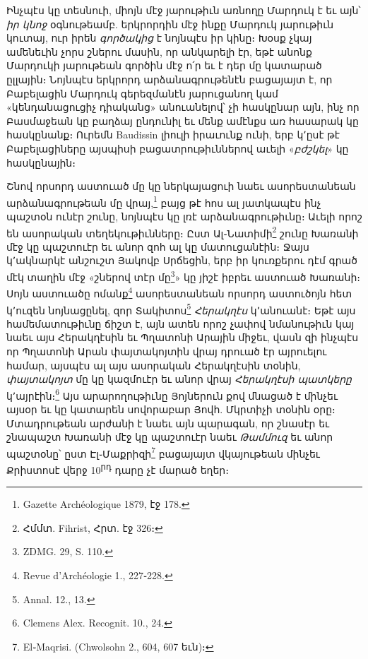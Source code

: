 \documentclass{article}
\begin{document}
{Ինչպէս կը տեսնուի, միոյն մէջ յարութիւն առնողը Մարդուկ է եւ այն՝ \emph{իր կնոջ} օգնութեամբ. երկրորդին մէջ ինքը Մարդուկ յարութիւն կուտայ, ուր իրեն \emph{գործակից} է նոյնպէս իր կինը։ Խօսք չկայ ամենեւին չորս շներու մասին, որ անկարելի էր, եթէ անոնք Մարդուկի յարութեան գործին մէջ ո՛ր եւ է դեր մը կատարած ըլլային։ Նոյնպէս երկրորդ արձանագրութենէն բացայայտ է, որ Բաբելացին Մարդուկ գերեզմանէն յարուցանող կամ «կենդանացուցիչ դիականց» անուանելով՝ չի հասկընար այն, ինչ որ Բասմաջեան կը բաղձայ ընդունիլ եւ մենք ամէնքս առ հասարակ կը հասկընանք։ Ուրեմն Baudissin լիուլի իրաւունք ունի, երբ կ՚ըսէ թէ Բաբելացիները այսպիսի բացատրութիւններով աւելի «\emph{բժշկել}» կը հասկընային։

Շնով որսորդ աստուած մը կը ներկայացուի նաեւ ասորեստանեան արձանագրութեան մը վրայ,\footnote{Gazette Archéologique 1879, էջ 178.} բայց թէ հոս ալ յատկապէս ինչ պաշտօն ունէր շունը, նոյնպէս կը լռէ արձանագրութիւնը։ Աւելի որոշ են ասորական տեղեկութիւնները։ Ըստ Ալ֊Նատիմի\footnote{Հմմտ. Fihrist, Հրտ. էջ 326։} շունը Խառանի մէջ կը պաշտուէր եւ անոր զոհ ալ կը մատուցանէին։ Ջայս կ՚ակնարկէ անշուշտ Յակովբ Սրճեցին, երբ իր կուռքերու դէմ գրած մէկ տաղին մէջ «շներով տէր մը\footnote{ZDMG. 29, S. 110.}» կը յիշէ իբրեւ աստուած Խառանի։ Սոյն աստուածը ոմանք\footnote{Revue d'Archéologie 1., 227֊228.} ասորեստանեան որսորդ աստուծոյն հետ կ՚ուզեն նոյնացընել, զոր Տակիտոս\footnote{Annal. 12., 13.} \emph{Հերակղէս} կ՚անուանէ։ Եթէ այս համեմատութիւնը ճիշտ է, այն ատեն որոշ չափով նմանութիւն կայ նաեւ այս Հերակղէսին եւ Պղատոնի Արային միջեւ, վասն զի ինչպէս որ Պղատոնի Արան փայտակոյտին վրայ դրուած էր այրուելու համար, այսպէս ալ այս ասորական Հերակղէսին տօնին, \emph{փայտակոյտ} մը կը կազմուէր եւ անոր վրայ \emph{Հերակղէսի պատկերը} կ՚այրէին։\footnote{Clemens Alex. Recognit. 10., 24.} Այս արարողութիւնը Յոյներուն քով մնացած է մինչեւ այսօր եւ կը կատարեն սովորաբար Յովհ. Մկրտիչի տօնին օրը։ Մտադրութեան արժանի է նաեւ այն պարագան, որ շնասէր եւ շնապաշտ Խառանի մէջ կը պաշտուէր նաեւ \emph{Թամմուզ} եւ անոր պաշտօնը՝ ըստ Էլ֊Մաքրիզի\footnote{El֊Maqrisi. (Chwolsohn 2., 604, 607 եւն)։} բացայայտ վկայութեան մինչեւ Քրիստոսէ վերջ 10\textsuperscript{րդ} դարը չէ մարած եղեր։

}
\end{document}
